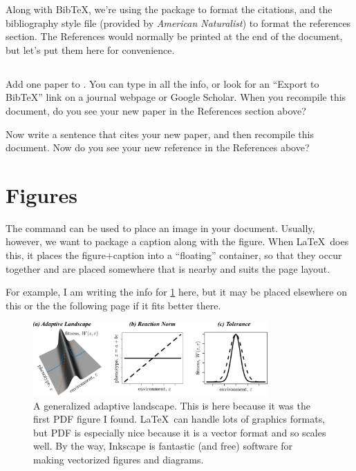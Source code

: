 \documentclass{article}
\begin{document}
Along with BibTeX, we're using the package  to format the citations, and the bibliography style file  (provided by \emph{American Naturalist}) to format the references section.
The References would normally be printed at the end of the document, but let's put them here for convenience.


\subsection{\task}

Add one paper to .
You can type in all the info, or look for an ``Export to BibTeX'' link on a journal webpage or Google Scholar.
When you recompile this document, do you see your new paper in the References section above?

Now write a sentence that cites your new paper, and then recompile this document.
Now do you see your new reference in the References above?

\section{Figures}
\label{sec:figures}

The  command can be used to place an image in your document.
Usually, however, we want to package a caption along with the figure.
When \LaTeX\ does this, it places the figure+caption into a ``floating'' container, so that they occur together and are placed somewhere that is nearby and suits the page layout.

For example, I am writing the info for \cref{fig:landscape} here, but it may be placed elsewhere on this or the the following page if it fits better there.
\begin{figure}
\centering\includegraphics[width=0.8\textwidth]{landscape.pdf}
\caption{A generalized adaptive landscape.
    This is here because it was the first PDF figure I found.
    \LaTeX\ can handle lots of graphics formats, but PDF is especially nice because it is a vector format and so scales well.
    By the way, Inkscape is fantastic (and free) software for making vectorized figures and diagrams.
}
\label{fig:landscape}
\end{figure}
\end{document}
